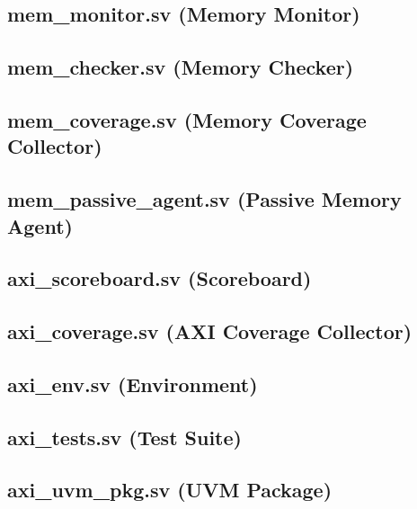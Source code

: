 \documentclass[10pt,a4paper]{article}
\begin{document}
\subsection{mem\_monitor.sv (Memory Monitor)}


\subsection{mem\_checker.sv (Memory Checker)}


\subsection{mem\_coverage.sv (Memory Coverage Collector)}


\subsection{mem\_passive\_agent.sv (Passive Memory Agent)}


\subsection{axi\_scoreboard.sv (Scoreboard)}


\subsection{axi\_coverage.sv (AXI Coverage Collector)}


\subsection{axi\_env.sv (Environment)}


\subsection{axi\_tests.sv (Test Suite)}


\subsection{axi\_uvm\_pkg.sv (UVM Package)}

\end{document}
